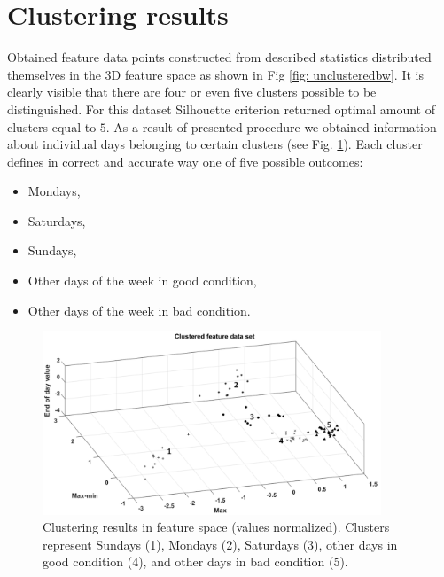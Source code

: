 \section{Clustering results}
Obtained feature data points constructed from described statistics distributed themselves in the 3D feature space as shown in Fig \ref{fig: unclusteredbw}. It is clearly visible that there are four or even five clusters possible to be distinguished. For this dataset Silhouette criterion returned optimal amount of clusters equal to $5$. As a result of presented procedure we obtained information about individual days belonging to certain clusters (see Fig. \ref{fig: clusteredbw}). Each cluster defines in correct and accurate way one of five possible outcomes:

\begin{itemize}
\renewcommand{\labelitemi}{$\bullet$}
\item Mondays,
\item Saturdays,
\item Sundays,
\item Other days of the week in good condition,
\item Other days of the week in bad condition.
\end{itemize}

\begin{figure}[ht!]
\vspace{-15pt}
\centering
\includegraphics[width = 0.9\textwidth]{Wykresy/clusteredbw.png}
\caption{Clustering results in feature space (values normalized). Clusters represent Sundays (1), Mondays (2), Saturdays (3), other days in good condition (4), and other days in bad condition (5).}
\label{fig: clusteredbw}
\vspace{-15pt}
\end{figure}

